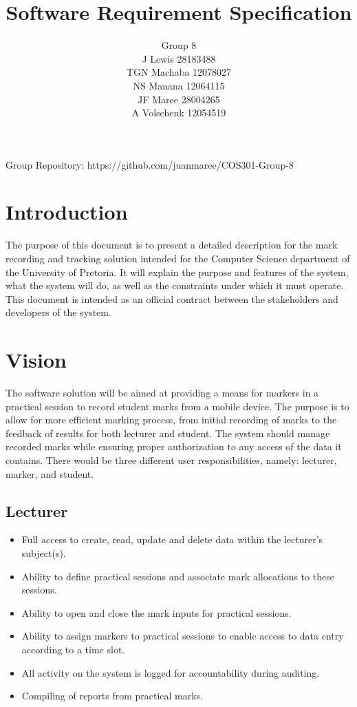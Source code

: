 \documentclass[a4paper]{article}
\begin{document}
	\title{\Huge{Software Requirement Specification}}
	\author{Group 8 \\ J Lewis	28183488\\
	TGN Machaba	12078027\\
	NS Manana	12064115\\
	JF Maree	28004265\\
	A Volschenk	12054519}
	\maketitle

Group Repository: https://github.com/juanmaree/COS301-Group-8

	\section{Introduction}

		The purpose of this document is to present a detailed description for the mark recording and tracking solution intended for the Computer Science department of the University of Pretoria. It will explain the purpose and features of the system, what the system will do, as well as the constraints under which it must operate. This document is intended as an official contract between the stakeholders and developers of the system.

	\section{Vision}

		The software solution will be aimed at providing a means for markers in a practical session to record student marks from a mobile device. The purpose is to allow for more efficient marking process, from initial recording of marks to the feedback of results for both lecturer and student. The system should manage recorded marks while ensuring proper authorization to any access of the data it contains. There would be three different user responsibilities, namely: lecturer, marker, and student.
		
		\subsection{Lecturer}
			\begin{itemize}
				\item	Full access to create, read, update and delete data within the lecturer's subject(s).
				\item	Ability to define practical sessions and associate mark allocations to these sessions.
				\item	Ability to open and close the mark inputs for practical sessions.
				\item	Ability to assign markers to practical sessions to enable access to data entry according to a time slot.
				\item	All activity on the system is logged for accountability during auditing.
				\item	Compiling of reports from practical marks.
			\end{itemize}
\end{document}
